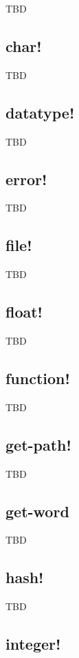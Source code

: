 \documentclass[12pt,a4paper]{article}
\begin{document}
TBD

\subsection{char!}

TBD

\subsection{datatype!}

TBD

\subsection{error!}

TBD

\subsection{file!}

TBD

\subsection{float!}

TBD

\subsection{function!}

TBD

\subsection{get-path!}

TBD

\subsection{get-word}

TBD

\subsection{hash!}

TBD

\subsection{integer!}
\end{document}
